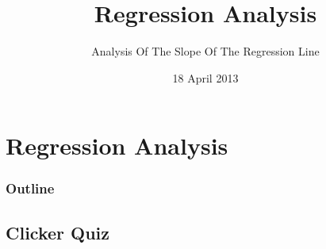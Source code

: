 
\section{Regression Analysis}

\title{Regression Analysis}
\subtitle{Analysis Of The Slope Of The Regression Line}

\date{18 April 2013}

\begin{frame}
  \titlepage
\end{frame}

\begin{frame}
  \frametitle{Outline}
  \tableofcontents[pausesection,hideothersubsections,sectionstyle=show/hide]
\end{frame}


\subsection{Clicker Quiz}


